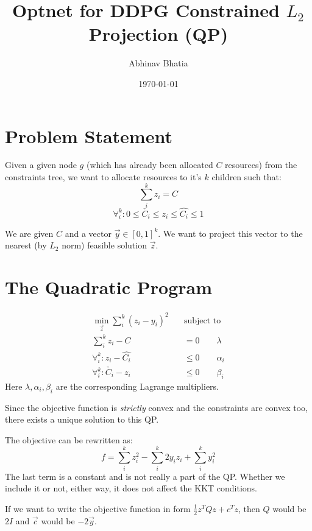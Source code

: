 \documentclass[11 pt]{article}
\begin{document}
\title{Optnet for DDPG Constrained $L_2$ Projection (QP)}
\author{Abhinav Bhatia}
\date{\today}
\maketitle


\section{Problem Statement}

Given a given node $g$ (which has already been allocated $C$ resources) from the constraints tree, we want to allocate resources to it's $k$ children such that:
\[\sum_i^k z_i = C \]
\[\forall_i^k : 0 \le \check{C_i} \le z_i \le \hat{C_i} \le 1\]

We are given $C$ and a vector $\vec{y} \in [0, 1]^k$. We want to project this vector to the nearest (by $L_2$ norm) feasible solution $\vec{z}$.


\section{The Quadratic Program}

\begin{equation} \label{qp}
    \begin{aligned}
        \underset{\vec{z}}{\min} \sum_i^k (z_i - y_i)^2 \quad &\text{subject to} \\
        \sum_i^k z_i - C &= 0                   \qquad \lambda\\
        \forall_i^k : z_i - \hat{C_i} &\le 0      \qquad \alpha_i\\
        \forall_i^k : \check{C_i} - z_i &\le 0    \qquad \beta_i
    \end{aligned}
\end{equation}
Here $\lambda,\alpha_i,\beta_i$ are the corresponding Lagrange multipliers.

Since the objective function is \textit{strictly} convex and the constraints are convex too, there exists a unique solution to this QP.

The objective can be rewritten as:
\[f = \sum_i^k z_i^2 - \sum_i^k 2 y_i z_i + \sum_i^k y_i^2\]
The last term is a constant and is not really a part of the QP. Whether we include it or not, either way, it does not affect the KKT conditions.

If we want to write the objective function in form $\frac{1}{2}z^T Q z + c^Tz$, then $Q$ would be $2I$ and $\vec{c}$ would be $-2\vec{y}$.
\end{document}
